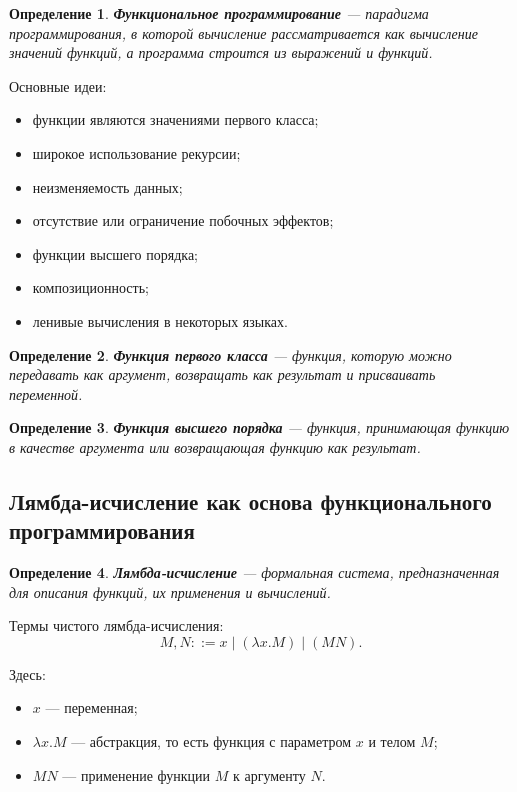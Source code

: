 \documentclass[12pt,a4paper]{article}
\newtheorem{definition}{Определение}
\begin{document}
\begin{definition}
\textbf{Функциональное программирование} --- парадигма программирования, в которой вычисление рассматривается как вычисление значений функций, а программа строится из выражений и функций.
\end{definition}

Основные идеи:
\begin{itemize}
    \item функции являются значениями первого класса;
    \item широкое использование рекурсии;
    \item неизменяемость данных;
    \item отсутствие или ограничение побочных эффектов;
    \item функции высшего порядка;
    \item композиционность;
    \item ленивые вычисления в некоторых языках.
\end{itemize}

\begin{definition}
\textbf{Функция первого класса} --- функция, которую можно передавать как аргумент, возвращать как результат и присваивать переменной.
\end{definition}

\begin{definition}
\textbf{Функция высшего порядка} --- функция, принимающая функцию в качестве аргумента или возвращающая функцию как результат.
\end{definition}

\subsection{Лямбда-исчисление как основа функционального программирования}

\begin{definition}
\textbf{Лямбда-исчисление} --- формальная система, предназначенная для описания функций, их применения и вычислений.
\end{definition}

Термы чистого лямбда-исчисления:
$$
M,N ::= x \mid (\lambda x.M) \mid (MN).
$$

Здесь:
\begin{itemize}
    \item $x$ --- переменная;
    \item $\lambda x.M$ --- абстракция, то есть функция с параметром $x$ и телом $M$;
    \item $MN$ --- применение функции $M$ к аргументу $N$.
\end{itemize}
\end{document}

